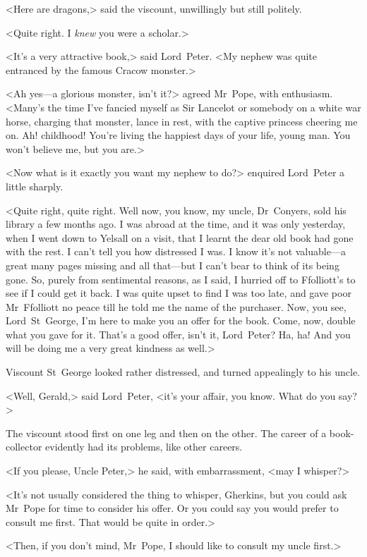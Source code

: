 <Here are dragons,> said the viscount, unwillingly but still politely.

<Quite right. I \textit{knew} you were a scholar.>

<It's a very attractive book,> said Lord~Peter. <My nephew was quite entranced by the famous Cracow monster.>

<Ah yes—a glorious monster, isn't it?> agreed Mr~Pope, with enthusiasm. <Many's the time I've fancied myself as Sir Lancelot or somebody on a white war horse, charging that monster, lance in rest, with the captive princess cheering me on. Ah! childhood! You're living the happiest days of your life, young man. You won't believe me, but you are.>

<Now what is it exactly you want my nephew to do?> enquired Lord~Peter a little sharply.

<Quite right, quite right. Well now, you know, my uncle, Dr~Conyers, sold his library a few months ago. I was abroad at the time, and it was only yesterday, when I went down to Yelsall on a visit, that I learnt the dear old book had gone with the rest. I can't tell you how distressed I was. I know it's not valuable—a great many pages missing and all that—but I can't bear to think of its being gone. So, purely from sentimental reasons, as I said, I hurried off to Ffolliott's to see if I could get it back. I was quite upset to find I was too late, and gave poor Mr~Ffolliott no peace till he told me the name of the purchaser. Now, you see, Lord~St~George, I'm here to make you an offer for the book. Come, now, double what you gave for it. That's a good offer, isn't it, Lord~Peter? Ha, ha! And you will be doing me a very great kindness as well.>

Viscount St~George looked rather distressed, and turned appealingly to his uncle.

<Well, Gerald,> said Lord~Peter, <it's your affair, you know. What do you say?>

The viscount stood first on one leg and then on the other. The career of a book-collector evidently had its problems, like other careers.

<If you please, Uncle Peter,> he said, with embarrassment, <may I whisper?>

<It's not usually considered the thing to whisper, Gherkins, but you could ask Mr~Pope for time to consider his offer. Or you could say you would prefer to consult me first. That would be quite in order.>

<Then, if you don't mind, Mr~Pope, I should like to consult my uncle first.>

